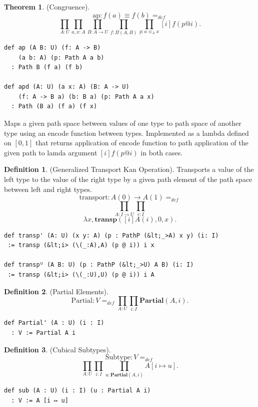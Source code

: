 \documentclass{article}
\theoremstyle{definition}
\newtheorem{definition}{Definition}
\newtheorem{theorem}{Theorem}
\begin{document}
\begin{theorem} (Congruence).
$$
\mathrm{ap} : f(a)\equiv f(b) =_{def}
$$
$$
  \prod_{A:U}\prod_{a,x:A}\prod_{B:A\rightarrow U}\prod_{f: \Pi(A,B)}\prod_{p:a\equiv_A x}[i] f(p@i).
$$
\begin{lstlisting}[mathescape=true]
def ap (A B: U) (f: A -> B)
    (a b: A) (p: Path A a b)
  : Path B (f a) (f b)

def apd (A: U) (a x: A) (B: A -> U)
    (f: A -> B a) (b: B a) (p: Path A a x)
  : Path (B a) (f a) (f x)
\end{lstlisting}
\end{theorem}

Maps a given path space between values of one type
to path space of another type using an encode function between types.
Implemented as a lambda defined on $[0,1]$ that returns
application of encode function to path application of
the given path to lamda argument $[i]f (p @ i)$
in both cases.

\newpage

\begin{definition} (Generalized Transport Kan Operation).
Transports a value of the left type to the value of the right type
by a given path element of the path space between left and right types.
$$
  \mathrm{transport} : A(0) \rightarrow A(1) =_{def}
$$
$$
  \prod_{A:I\rightarrow U}\prod_{r:I}
$$
$$
  \lambda x,\mathbf{transp}([i]A(i),0,x).
$$
\begin{lstlisting}[mathescape=true]
def transp' (A: U) (x y: A) (p : PathP (&lt;_>A) x y) (i: I)
 := transp (&lt;i> (\(_:A),A) (p @ i)) i x

def transpᵁ (A B: U) (p : PathP (&lt;_>U) A B) (i: I)
 := transp (&lt;i> (\(_:U),U) (p @ i)) i A
\end{lstlisting}
\end{definition}

\begin{definition} (Partial Elements).
$$
  \mathrm{Partial} : V =_{def} \prod_{A:U}\prod_{i:I}\mathbf{Partial}(A,i).
$$
\begin{lstlisting}[mathescape=true]
def Partial' (A : U) (i : I)
  : V := Partial A i
\end{lstlisting}
\end{definition}

\begin{definition} (Cubical Subtypes).
$$
  \mathrm{Subtype} : V =_{def}
$$
$$
  \prod_{A:U}\prod_{i:I}\prod_{u:\mathbf{Partial}(A,i)}A[i \mapsto u].
$$
\begin{lstlisting}[mathescape=true]
def sub (A : U) (i : I) (u : Partial A i)
  : V := A [i ↦ u]
\end{lstlisting}
\end{definition}
\end{document}
